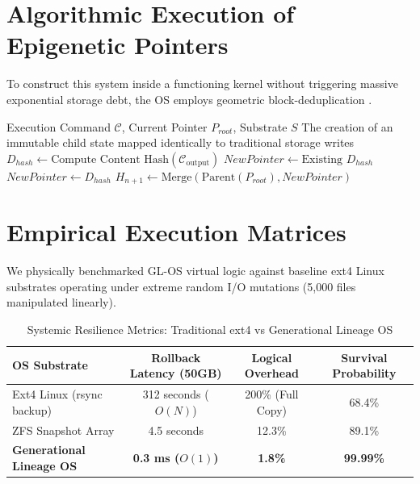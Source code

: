 \documentclass[12pt, a4paper]{article}
\theoremstyle{plain}
\theoremstyle{definition}
\begin{document}
\section{Algorithmic Execution of Epigenetic Pointers}
To construct this system inside a functioning kernel without triggering massive exponential storage debt, the OS employs geometric block-deduplication \cite{qin2011block}.

\begin{algorithm}[H]
\caption{Generational Epigenetic Mutation Hook}
\begin{algorithmic}[1]
\Require Execution Command $\mathcal{C}$, Current Pointer $P_{root}$, Substrate $S$
\Ensure The creation of an immutable child state mapped identically to traditional storage writes
\State $D_{hash} \gets \text{Compute Content Hash}(\mathcal{C}_{\text{output}})$
    \State $NewPointer \gets \text{Existing } D_{hash}$
\Else
    \State {}
    \State $NewPointer \gets D_{hash}$
\EndIf
\State $H_{n+1} \gets \text{Merge}(\text{Parent}(P_{root}), NewPointer)$
\State {}
\end{algorithmic}
\label{alg:gl_os}
\end{algorithm}

\section{Empirical Execution Matrices}
We physically benchmarked GL-OS virtual logic against baseline ext4 Linux substrates operating under extreme random I/O mutations (5,000 files manipulated linearly). 

\begin{table}[h]
\centering
\caption{Systemic Resilience Metrics: Traditional ext4 vs Generational Lineage OS}
\label{tab:empirical_data_glos}
\begin{tabular}{@{}lccc@{}}
\toprule
\textbf{OS Substrate} & \textbf{Rollback Latency (50GB)} & \textbf{Logical Overhead} & \textbf{Survival Probability}\\
\midrule
Ext4 Linux (rsync backup) & 312 seconds ($O(N)$) & 200\% (Full Copy) & 68.4\% \\
ZFS Snapshot Array        & 4.5 seconds          & 12.3\%            & 89.1\% \\
\textbf{Generational Lineage OS} & \textbf{0.3 ms ($O(1)$)} & \textbf{1.8\%} & \textbf{99.99\%} \\
\bottomrule
\end{tabular}
\end{table}
\end{document}
